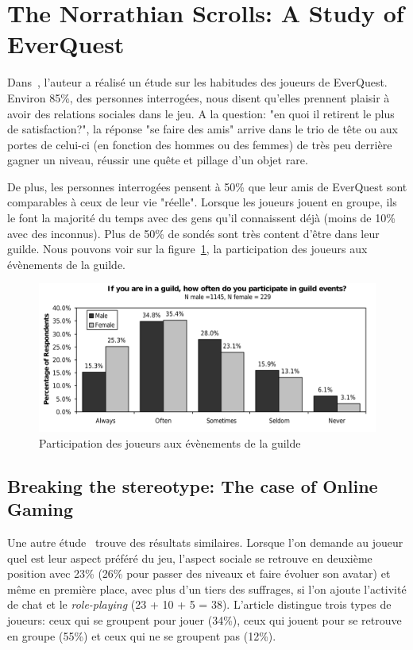 \documentclass[11pt,a4paper]{article}
\begin{document}
\section{The Norrathian Scrolls: A Study of EverQuest}
Dans~\cite{StudyEQ}, l'auteur a réalisé un étude sur les habitudes des joueurs de EverQuest. Environ 85\%, des personnes interrogées, nous disent qu'elles prennent plaisir à avoir des relations sociales dans le jeu. A la question: "en quoi il retirent le plus de satisfaction?", la réponse "se faire des amis" arrive dans le trio de tête ou aux portes de celui-ci (en fonction des hommes ou des femmes) de très peu derrière gagner un niveau, réussir une quête et pillage d'un objet rare.
\par De plus, les personnes interrogées pensent à 50\% que leur amis de EverQuest sont comparables à ceux de leur vie "réelle". Lorsque les joueurs jouent en groupe, ils le font la majorité du temps avec des gens qu'il connaissent déjà (moins de 10\% avec des inconnus). Plus de 50\% de sondés sont très content d'être dans leur guilde. Nous pouvons voir sur la figure~\ref{guildpres}, la participation des joueurs aux évènements de la guilde.
        \begin{figure}[!h]
        \centering
        \includegraphics[scale=0.75]{./images/studypres.png}
        \caption{Participation des joueurs aux évènements de la guilde}
        \label{guildpres}
        \end{figure}
\subsection{Breaking the stereotype: The case of Online Gaming}
Une autre étude~\cite{BreakingSteretype} trouve des résultats similaires. Lorsque l'on demande au joueur quel est leur aspect préféré du jeu, l'aspect sociale se retrouve en deuxième position avec 23\% (26\% pour passer des niveaux et faire évoluer son avatar) et même en première place, avec plus d'un tiers des suffrages, si l'on ajoute l'activité de chat et le \textit{role-playing} (23 + 10 + 5 = 38). L'article distingue trois types de joueurs: ceux qui se groupent pour jouer (34\%), ceux qui jouent pour se retrouve en groupe (55\%) et ceux qui ne se groupent pas (12\%).
\end{document}
